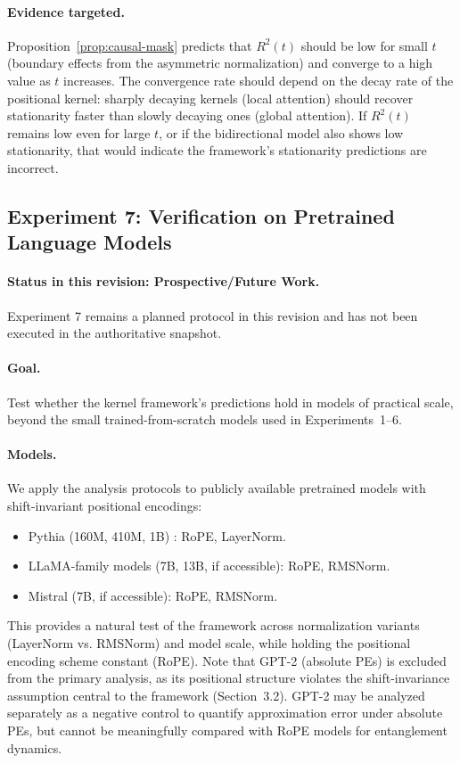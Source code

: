 \documentclass[11pt]{article}
\theoremstyle{definition}
\begin{document}
\paragraph{Evidence targeted.}
Proposition~\ref{prop:causal-mask} predicts that $R^2(t)$ should be low for small $t$ (boundary effects from the asymmetric normalization) and converge to a high value as $t$ increases. The convergence rate should depend on the decay rate of the positional kernel: sharply decaying kernels (local attention) should recover stationarity faster than slowly decaying ones (global attention). If $R^2(t)$ remains low even for large $t$, or if the bidirectional model also shows low stationarity, that would indicate the framework's stationarity predictions are incorrect.

\subsection{Experiment 7: Verification on Pretrained Language Models}
\label{sec:exp-pretrained}

\paragraph{Status in this revision: \textbf{Prospective/Future Work}.}
Experiment 7 remains a planned protocol in this revision and has not been executed in the authoritative snapshot.

\paragraph{Goal.}
Test whether the kernel framework's predictions hold in models of practical scale, beyond the small trained-from-scratch models used in Experiments~1--6.

\paragraph{Models.}
We apply the analysis protocols to publicly available pretrained models with shift-invariant positional encodings:
\begin{itemize}
    \item Pythia (160M, 410M, 1B) \cite{biderman2023pythia}: RoPE, LayerNorm.
    \item LLaMA-family models (7B, 13B, if accessible): RoPE, RMSNorm.
    \item Mistral (7B, if accessible): RoPE, RMSNorm.
\end{itemize}
This provides a natural test of the framework across normalization variants (LayerNorm vs. RMSNorm) and model scale, while holding the positional encoding scheme constant (RoPE). Note that GPT-2 (absolute PEs) is excluded from the primary analysis, as its positional structure violates the shift-invariance assumption central to the framework (Section~3.2). GPT-2 may be analyzed separately as a negative control to quantify approximation error under absolute PEs, but cannot be meaningfully compared with RoPE models for entanglement dynamics.
\end{document}
